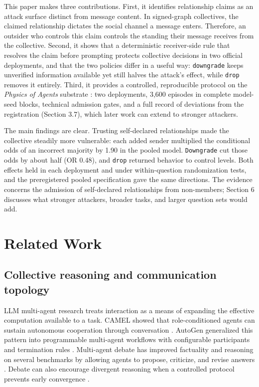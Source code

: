 \documentclass[11pt]{article}
\begin{document}
This paper makes three contributions. First, it identifies relationship claims as an attack surface distinct from message content. In signed-graph collectives, the claimed relationship dictates the social channel a message enters. Therefore, an outsider who controls this claim controls the standing their message receives from the collective. Second, it shows that a deterministic receiver-side rule that resolves the claim before prompting protects collective decisions in two official deployments, and that the two policies differ in a useful way: \texttt{downgrade} keeps unverified information available yet still halves the attack's effect, while \texttt{drop} removes it entirely. Third, it provides a controlled, reproducible protocol on the \textit{Physics of Agents} substrate \cite{el2026physics}: two deployments, 3,600 episodes in complete model-seed blocks, technical admission gates, and a full record of deviations from the registration (Section 3.7), which later work can extend to stronger attackers.

The main findings are clear. Trusting self-declared relationships made the collective steadily more vulnerable: each added sender multiplied the conditional odds of an incorrect majority by 1.90 in the pooled model. \texttt{Downgrade} cut those odds by about half (OR 0.48), and \texttt{drop} returned behavior to control levels. Both effects held in each deployment and under within-question randomization tests, and the preregistered pooled specification gave the same directions. The evidence concerns the admission of self-declared relationships from non-members; Section 6 discusses what stronger attackers, broader tasks, and larger question sets would add.

\section{Related Work}

\subsection{Collective reasoning and communication topology}

LLM multi-agent research treats interaction as a means of expanding the effective computation available to a task. CAMEL showed that role-conditioned agents can sustain autonomous cooperation through conversation \cite{li2023camel}. AutoGen generalized this pattern into programmable multi-agent workflows with configurable participants and termination rules \cite{wu2024autogen}. Multi-agent debate has improved factuality and reasoning on several benchmarks by allowing agents to propose, criticize, and revise answers \cite{du2024debate}. Debate can also encourage divergent reasoning when a controlled protocol prevents early convergence \cite{liang2024divergent}.
\end{document}
